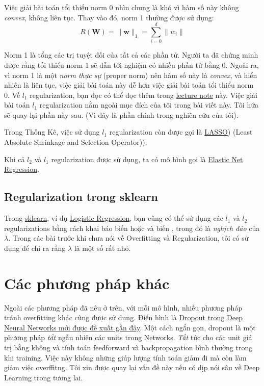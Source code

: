 Việc giải bài toán tổi thiểu norm 0 nhìn chung là khó vì hàm số này không \textit{convex}, không liên tục. Thay vào đó, norm 1 thường được sử dụng: 
\begin{equation*} 
R(\mathbf{W}) = \|\mathbf{w}\|_1 = \sum_{i=0}^d \|w_i\| 
\end{equation*} 
 
Norm 1 là tổng các trị tuyệt đối của tất cả các phần tử. Người ta đã chứng minh được rằng tối thiểu norm 1 sẽ dẫn tới nghiệm có nhiều phần tử bằng 0. Ngoài ra, vì norm 1 là một \textit{norm thực sự} (proper norm) nên hàm số này là \textit{convex}, và hiển nhiên là liên tục, việc giải bài toán này dễ hơn việc giải bài toán tổi thiểu norm 0. Về $l_1$ regularization, bạn đọc có thể đọc thêm trong \href{http://machinelearningcoban.com$l_1$ regularization}{lecture note} này. Việc giải bài toán $l_1$ regularization nằm ngoài mục đích của tôi trong bài viết này. Tôi hứa sẽ quay lại phần này sau. (Vì đây là phần chính trong nghiên cứu của tôi). 
 
Trong Thống Kê, việc sử dụng $l_1$ regularization còn được gọi là \href{https://en.wikipedia.org/wiki/Lasso_(statistics}{LASSO}) (Least Absolute Shrinkage and Selection Operator)). 
 
Khi cả $l_2$ và $l_1$ regularization được sử dụng, ta có mô hình gọi là \href{https://en.wikipedia.org/wiki/Elastic_net_regularization}{Elastic Net Regression}. 
 
 
\subsection{Regularization trong sklearn}
 
Trong \href{http://scikit-learn.org/stable/modules/generated/sklearn.linear_model.LogisticRegression.html}{sklearn}, ví dụ \href{http://machinelearningcoban.com/2017/01/27/logisticregression/}{Logistic Regression}, bạn cũng có thể sử dụng các $l_1$ và $l_2$ regularizations bằng cách khai báo biến  hoặc  và biến , trong đó  là \textit{nghịch đảo} của $\lambda$. Trong các bài trước khi chưa nói về  Overfitting và Regularization, tôi có sử dụng  để chỉ ra rằng $\lambda$ là một số rất nhỏ. 
 
 
\section{Các phương pháp khác}
Ngoài các phương pháp đã nêu ở trên, với mỗi mô hình, nhiều phương pháp tránh overfitting khác cũng được sử dụng. Điển hình là \href{http://jmlr.org/papers/volume15/srivastava14a/srivastava14a.pdf}{Dropout trong Deep Neural Networks mới được đề xuất gần đây}. Một cách ngắn gọn, dropout là một phương pháp \textit{tắt} ngẫu nhiên các units trong Networks. \textit{Tắt} tức cho các unit giá trị bằng không và tính toán feedforward và backpropagation bình thường trong khi training. Việc này không những giúp lượng tính toán giảm đi mà còn làm giảm việc overffitng. Tôi xin được quay lại vấn đề này nếu có dịp nói  sâu về Deep Learning trong tương lai. 
 
